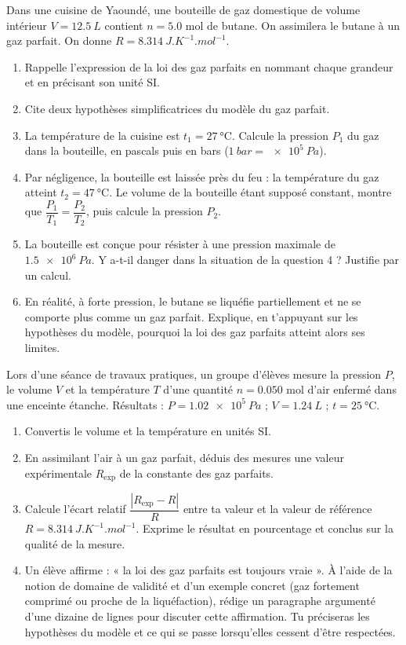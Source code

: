 \documentclass[11pt]{article}
\begin{document}
\begin{exercice}
Dans une cuisine de Yaoundé, une bouteille de gaz domestique de volume intérieur $V = \SI{12,5}{L}$ contient $n = \num{5,0}$ mol de butane. On assimilera le butane à un gaz parfait. On donne $R = \SI{8,314}{J.K^{-1}.mol^{-1}}$.
\begin{enumerate}
\item Rappelle l'expression de la loi des gaz parfaits en nommant chaque grandeur et en précisant son unité SI.
\item Cite deux hypothèses simplificatrices du modèle du gaz parfait.
\item La température de la cuisine est $t_1 = \SI{27}{\celsius}$. Calcule la pression $P_1$ du gaz dans la bouteille, en pascals puis en bars ($\SI{1}{bar} = \SI{e5}{Pa}$).
\item Par négligence, la bouteille est laissée près du feu : la température du gaz atteint $t_2 = \SI{47}{\celsius}$. Le volume de la bouteille étant supposé constant, montre que $\dfrac{P_1}{T_1} = \dfrac{P_2}{T_2}$, puis calcule la pression $P_2$.
\item La bouteille est conçue pour résister à une pression maximale de $\SI{1,5e6}{Pa}$. Y a-t-il danger dans la situation de la question 4 ? Justifie par un calcul.
\item En réalité, à forte pression, le butane se liquéfie partiellement et ne se comporte plus comme un gaz parfait. Explique, en t'appuyant sur les hypothèses du modèle, pourquoi la loi des gaz parfaits atteint alors ses limites.
\end{enumerate}
\end{exercice}

\begin{exercice}
Lors d'une séance de travaux pratiques, un groupe d'élèves mesure la pression $P$, le volume $V$ et la température $T$ d'une quantité $n = \num{0,050}$ mol d'air enfermé dans une enceinte étanche. Résultats : $P = \SI{1,02e5}{Pa}$ ; $V = \SI{1,24}{L}$ ; $t = \SI{25}{\celsius}$.
\begin{enumerate}
\item Convertis le volume et la température en unités SI.
\item En assimilant l'air à un gaz parfait, déduis des mesures une valeur expérimentale $R_{\text{exp}}$ de la constante des gaz parfaits.
\item Calcule l'écart relatif $\dfrac{|R_{\text{exp}} - R|}{R}$ entre ta valeur et la valeur de référence $R = \SI{8,314}{J.K^{-1}.mol^{-1}}$. Exprime le résultat en pourcentage et conclus sur la qualité de la mesure.
\item Un élève affirme : « la loi des gaz parfaits est toujours vraie ». À l'aide de la notion de domaine de validité et d'un exemple concret (gaz fortement comprimé ou proche de la liquéfaction), rédige un paragraphe argumenté d'une dizaine de lignes pour discuter cette affirmation. Tu préciseras les hypothèses du modèle et ce qui se passe lorsqu'elles cessent d'être respectées.
\end{enumerate}
\end{exercice}
\end{document}
